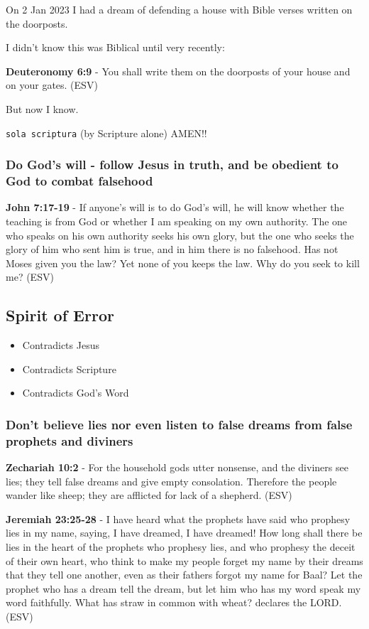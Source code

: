 \documentclass[11pt]{article}
\begin{document}
On 2 Jan 2023 I had a dream of defending a house with Bible verses written
on the doorposts.

I didn't know this was Biblical until very recently:

\textbf{Deuteronomy 6:9} -  You shall write them on the doorposts of your house and on your gates.  (ESV)

But now I know.

\texttt{sola scriptura} (by Scripture alone) AMEN!!

\subsubsection{Do God's will - follow Jesus in truth, and be obedient to God to combat falsehood}
\label{sec:orgd5c645d}
\textbf{John 7:17-19} - If anyone's will is to do God's will, he will know whether the teaching is from God or whether I am speaking on my own authority. The one who speaks on his own authority seeks his own glory, but the one who seeks the glory of him who sent him is true, and in him there is no falsehood. Has not Moses given you the law? Yet none of you keeps the law. Why do you seek to kill me? (ESV)

\subsection{Spirit of Error}
\label{sec:orgefcb1de}
\begin{itemize}
\item Contradicts Jesus
\item Contradicts Scripture
\item Contradicts God's Word
\end{itemize}

\subsubsection{Don't believe lies nor even listen to false dreams from false prophets and diviners}
\label{sec:org54b59ce}
\textbf{Zechariah 10:2} - For the household gods utter nonsense, and the diviners see lies; they tell false dreams and give empty consolation. Therefore the people wander like sheep; they are afflicted for lack of a shepherd. (ESV)

\textbf{Jeremiah 23:25-28} -  I have heard what the prophets have said who prophesy lies in my name, saying, I have dreamed, I have dreamed! How long shall there be lies in the heart of the prophets who prophesy lies, and who prophesy the deceit of their own heart, who think to make my people forget my name by their dreams that they tell one another, even as their fathers forgot my name for Baal?  Let the prophet who has a dream tell the dream, but let him who has my word speak my word faithfully.  What has straw in common with wheat?  declares the LORD.  (ESV)
\end{document}
